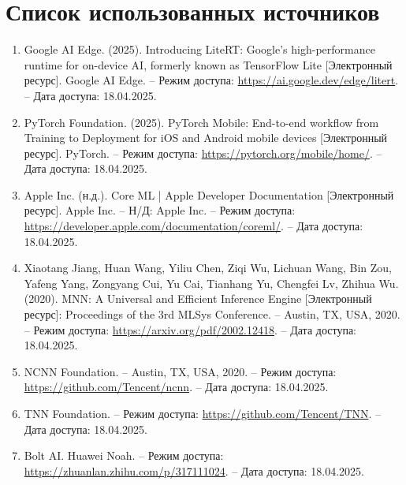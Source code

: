 \documentclass[a4paper,14pt]{extreport}
\begin{document}
    \chapter*{Список использованных источников}
    \begin{enumerate}
        \item \hypertarget{[1]}{}Google AI Edge. (2025). Introducing LiteRT: Google's high-performance runtime for on-device AI, formerly known as TensorFlow Lite [Электронный ресурс]. Google AI Edge. – Режим доступа: \href{https://ai.google.dev/edge/litert}{https://ai.google.dev/edge/litert}. – Дата доступа: 18.04.2025.
        
        \item \hypertarget{[2]}{}PyTorch Foundation. (2025). PyTorch Mobile: End-to-end workflow from Training to Deployment for iOS and Android mobile devices [Электронный ресурс]. PyTorch. – Режим доступа: \href{https://pytorch.org/mobile/home/}{https://pytorch.org/mobile/home/}. – Дата доступа: 18.04.2025.
        
        \item \hypertarget{[3]}{}Apple Inc. (н.д.). Core ML | Apple Developer Documentation [Электронный ресурс]. Apple Inc. – Н/Д: Apple Inc. – Режим доступа: \href{https://developer.apple.com/documentation/coreml/}{https://developer.apple.com/documentation/coreml/}. – Дата доступа: 18.04.2025.
        
        \item \hypertarget{[4]}{}Xiaotang Jiang, Huan Wang, Yiliu Chen, Ziqi Wu, Lichuan Wang, Bin Zou, Yafeng Yang, Zongyang Cui, Yu Cai, Tianhang Yu, Chengfei Lv, Zhihua Wu. (2020). MNN: A Universal and Efficient Inference Engine [Электронный ресурс]: Proceedings of the 3rd MLSys Conference. – Austin, TX, USA, 2020. – Режим доступа: \href{https://arxiv.org/pdf/2002.12418}{https://arxiv.org/pdf/2002.12418}. – Дата доступа: 18.04.2025.

        \item \hypertarget{[5]}{}NCNN Foundation. – Austin, TX, USA, 2020. – Режим доступа: \href{https://github.com/Tencent/ncnn}{https://github.com/Tencent/ncnn}. – Дата доступа: 18.04.2025.

        \item \hypertarget{[6]}{} TNN Foundation. – Режим доступа: \href{https://github.com/Tencent/TNN}{https://github.com/Tencent/TNN}. – Дата доступа: 18.04.2025.

        \item \hypertarget{[7]}{} Bolt AI. Huawei Noah. – Режим доступа: \href{https://zhuanlan.zhihu.com/p/317111024}{https://zhuanlan.zhihu.com/p/317111024}. – Дата доступа: 18.04.2025.


\end{enumerate}
\end{document}
